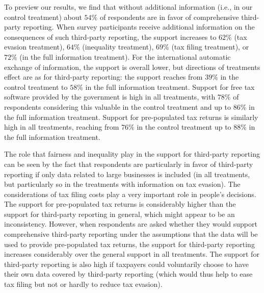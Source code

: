 \documentclass[12pt]{article}
\begin{document}
To preview our results, we find that without additional information (i.e., in our control treatment) about $54\%$ of respondents are in favor of comprehensive third-party reporting. When survey participants receive additional information on the consequences of such third-party reporting, the support increases to $62\%$ (tax evasion treatment), $64\%$ (inequality treatment), $69\%$ (tax filing treatment), or $72\%$ (in the full information treatment). For the international automatic exchange of information, the support is overall lower, but directions of treatments effect are as for third-party reporting: the support reaches from $39\%$ in the control treatment to $58\%$ in the full information treatment. Support for free tax software provided by the government is high in all treatments, with $78\%$ of respondents considering this valuable in the control treatment and up to $86\%$ in the full information treatment. Support for pre-populated tax returns is similarly high in all treatments, reaching from $76\%$ in the control treatment up to $88\%$ in the full information treatment.

The role that fairness and inequality play in the support for third-party reporting can be seen by the fact that respondents are particularly in favor of third-party reporting if only data related to large businesses is included (in all treatments, but particularly so in the treatments with information on tax evasion). The considerations of tax filing costs play a very important role in people's decisions. The support for pre-populated tax returns is considerably higher than the support for third-party reporting in general, which might appear to be an inconsistency. However, when respondents are asked whether they would support comprehensive third-party reporting under the assumptions that the data will be used to provide pre-populated tax returns, the support for third-party reporting increases considerably over the general support in all treatments. The support for third-party reporting is also high if taxpayers could voluntarily choose to have their own data covered by third-party reporting (which would thus help to ease tax filing but not or hardly to reduce tax evasion).
\end{document}
